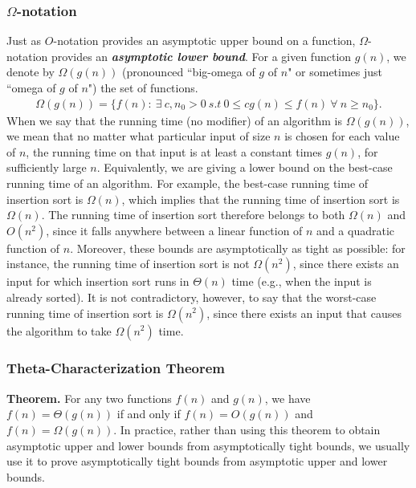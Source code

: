 \documentclass{report}
\begin{document}
        \pagebreak 
        \subsubsection{$\Omega$-notation}
        \bigbreak \noindent 
        Just as $O$-notation provides an asymptotic upper bound on a function, $\Omega$-notation 
        provides an \textbf{\textit{asymptotic lower bound}}. For a given function $g(n)$, we denote 
        by $\Omega(g(n))$ (pronounced ``big-omega of $g$ of $n$" or sometimes just ``omega of $g$ 
        of $n$") the set of functions.
        \begin{align*}
            \Omega(g(n)) = \{f(n):\ \exists \ c,n_{0} > 0 \ s.t \ 0 \leq cg(n) \leq f(n) \ \forall \ n \geq n_{0}\}
        .\end{align*}
        \bigbreak \noindent 
        When we say that the running time (no modifier) of an algorithm is $\Omega(g(n))$, we mean that no matter what particular input of size $n$ is chosen for each value of $n$, the running time on that input is at least a constant times $g(n)$, for sufficiently large $n$. Equivalently, we are giving a lower bound on the best-case running time of an algorithm. For example, the best-case running time of insertion sort is $\Omega(n)$, which implies that the running time of insertion sort is $\Omega(n)$.
        \bigbreak \noindent 
        The running time of insertion sort therefore belongs to both $\Omega(n)$ and $O(n^2)$, 
        since it falls anywhere between a linear function of $n$ and a quadratic function of $n$. 
        Moreover, these bounds are asymptotically as tight as possible: for instance, the 
        running time of insertion sort is not $\Omega(n^2)$, since there exists an input for which 
        insertion sort runs in $\Theta(n)$ time (e.g., when the input is already sorted). It is not 
        contradictory, however, to say that the worst-case running time of insertion sort 
        is $\Omega(n^2)$, since there exists an input that causes the algorithm to take $\Omega(n^2)$ time.



        \bigbreak \noindent 
        \subsubsection{Theta-Characterization Theorem}
        \bigbreak \noindent 
        \textbf{Theorem.} For any two functions $f(n)$ and $g(n)$, we have $f(n) = \Theta(g(n))$ if and only if $f(n) = O(g(n))$ and $f(n) = \Omega(g(n))$.
        \bigbreak \noindent 
        In practice, rather than using this theorem to obtain asymptotic upper and lower bounds from asymptotically tight bounds, we usually use it to prove asymptotically tight bounds from asymptotic upper and lower bounds.
\end{document}
